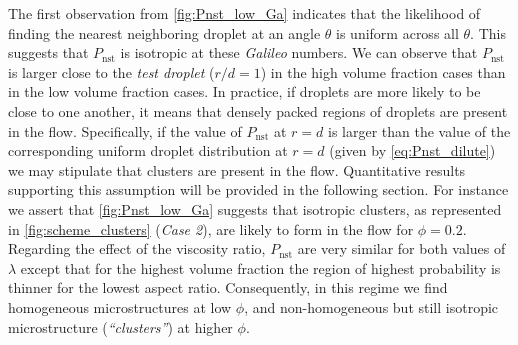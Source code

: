 The first observation from \ref{fig:Pnst_low_Ga} indicates that the likelihood of finding the nearest neighboring droplet at an angle $\theta$ is uniform across all $\theta$.
This suggests that $P_\text{nst}$ is isotropic at these \textit{Galileo} numbers. We can observe that $P_\text{nst}$ is larger close to the \textit{test droplet} ($r/d = 1$) in the high volume fraction cases than in the low volume fraction cases.
In practice, if droplets are more likely to be close to one another, it means that densely packed regions of droplets are present in the flow.
Specifically, if the value of $P_\text{nst}$ at $r=d$ is larger than the value of the corresponding uniform droplet distribution at $r=d$ (given by \ref{eq:Pnst_dilute}) we may stipulate that clusters are present in the flow. 
Quantitative results supporting this assumption will be provided in the following section. 
For instance we assert that \ref{fig:Pnst_low_Ga} suggests that isotropic clusters, as represented in \ref{fig:scheme_clusters} (\textit{Case 2}), are likely to form in the flow for $\phi = 0.2$. 
Regarding the effect of the viscosity ratio, $P_\text{nst}$ are very similar for both values of $\lambda$ except that for the highest volume fraction the region of highest probability is thinner for the lowest aspect ratio. 
Consequently, in this regime we find homogeneous microstructures at low $\phi$, and non-homogeneous but still isotropic microstructure (\textit{``clusters''}) at higher $\phi$. 

